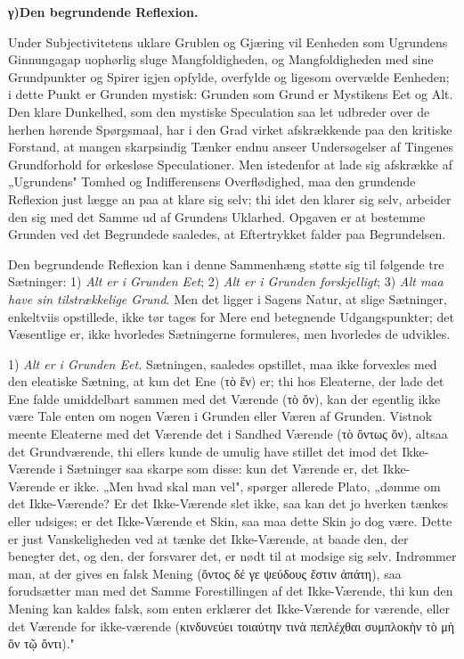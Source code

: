 \documentclass[12pt]{book}
\newcommand{\opage}[1]{\marginnote{\footnotesize\textit{[#1]}}}
\begin{document}
\begin{center}{\bfseries γ)\quad Den begrundende Reflexion.}\end{center}

Under Subjectivitetens uklare Grublen og Gjæring vil Eenheden som Ugrundens
Ginnungagap uophørlig sluge Mangfoldigheden, og Mangfoldigheden med sine Grundpunkter
og Spirer igjen opfylde, overfylde og ligesom overvælde Eenheden; i dette Punkt er
Grunden mystisk: Grunden som Grund er Mystikens Eet og Alt. Den klare Dunkelhed, som
den mystiske Speculation saa let udbreder over de herhen hørende Spørgsmaal, har i den
Grad virket afskrækkende paa den kritiske Forstand, at mangen skarpsindig Tænker endnu
anseer Undersøgelser af Tingenes Grundforhold for ørkesløse Speculationer. Men
istedenfor at lade sig afskrække af „Ugrundens" Tomhed og Indifferensens
Overflødighed, maa den grundende Reflexion just lægge an paa at klare sig selv; thi
idet den
\opage{93} klarer sig selv, arbeider den sig med det Samme ud af Grundens Uklarhed. Opgaven er at
bestemme Grunden ved det Begrundede saaledes, at Eftertrykket falder paa Begrundelsen.

Den begrundende Reflexion kan i denne Sammenhæng støtte sig til følgende tre
Sætninger: 1) \emph{Alt er i Grunden Eet}; 2) \emph{Alt er i Grunden forskjelligt};
3) \emph{Alt maa have sin tilstrækkelige Grund}. Men det ligger i Sagens Natur, at
slige Sætninger, enkeltviis opstillede, ikke tør tages for Mere end betegnende
Udgangspunkter; det Væsentlige er, ikke hvorledes Sætningerne formuleres, men
hvorledes de udvikles.

1) \emph{Alt er i Grunden Eet.} Sætningen, saaledes opstillet, maa ikke forvexles med
den eleatiske Sætning, at kun det Ene (τὸ ἕν) er; thi hos Eleaterne, der lade det Ene
falde umiddelbart sammen med det Værende (τὸ ὄν), kan der egentlig ikke være Tale
enten om nogen Væren i Grunden eller Væren af Grunden. Vistnok meente Eleaterne med
det Værende det i Sandhed Værende (τὸ ὄντως ὄν), altsaa det Grundværende, thi ellers
kunde de umulig have stillet det imod det Ikke-Værende i Sætninger saa skarpe som
disse: kun det Værende er, det Ikke-Værende er ikke. „Men hvad skal man vel", spørger
allerede Plato, „dømme om det Ikke-Værende? Er det Ikke-Værende slet ikke, saa kan det
jo hverken tænkes eller udsiges; er det Ikke-Værende et Skin, saa maa dette Skin jo
dog være. Dette er just Vanskeligheden ved at tænke det Ikke-Værende, at baade den,
der benegter det, og den, der forsvarer det, er nødt til at modsige sig selv.
Indrømmer man, at der gives en falsk Mening (ὄντος δέ γε ψεύδους ἔστιν ἀπάτη), saa
forudsætter man med det Samme Forestillingen af det Ikke-Værende, thi kun den Mening
kan kaldes falsk, som enten erklærer det Ikke-Værende for værende, eller det Værende
for ikke-værende
\opage{94} (κινδυνεύει τοιαύτην τινὰ πεπλέχθαι συμπλοκὴν τὸ μὴ ὄν τῷ ὄντι)."
\end{document}

